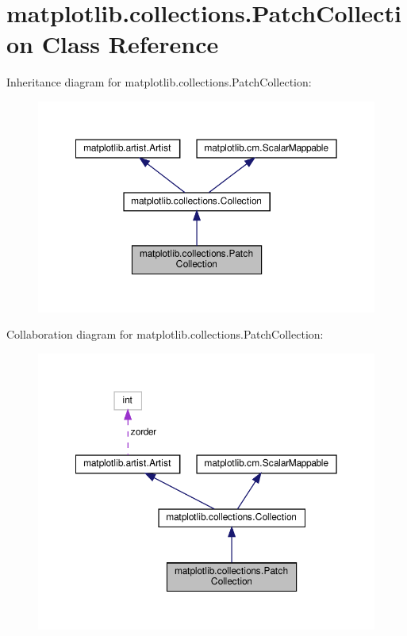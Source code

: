 \hypertarget{classmatplotlib_1_1collections_1_1PatchCollection}{}\section{matplotlib.\+collections.\+Patch\+Collection Class Reference}
\label{classmatplotlib_1_1collections_1_1PatchCollection}


Inheritance diagram for matplotlib.\+collections.\+Patch\+Collection\+:
\nopagebreak
\begin{figure}[H]
\begin{center}
\leavevmode
\includegraphics[width=350pt]{classmatplotlib_1_1collections_1_1PatchCollection__inherit__graph}
\end{center}
\end{figure}


Collaboration diagram for matplotlib.\+collections.\+Patch\+Collection\+:
\nopagebreak
\begin{figure}[H]
\begin{center}
\leavevmode
\includegraphics[width=350pt]{classmatplotlib_1_1collections_1_1PatchCollection__coll__graph}
\end{center}
\end{figure}
